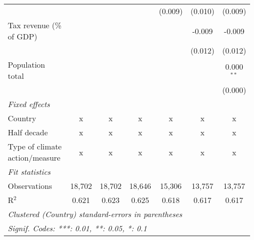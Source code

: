 \begin{tabular}{lcccccc}
                                                        &         &              &               & (0.009)        & (0.010)        & (0.009)\\   
   Tax revenue (\% of GDP)                              &         &              &               &                & -0.009         & -0.009\\   
                                                        &         &              &               &                & (0.012)        & (0.012)\\   
   Population total                                     &         &              &               &                &                & 0.000$^{**}$\\   
                                                        &         &              &               &                &                & (0.000)\\   
   \emph{Fixed effects}\\
   Country                                              & x       & x            & x             & x              & x              & x\\  
   Half decade                                          & x       & x            & x             & x              & x              & x\\  
   Type of climate action/measure                       & x       & x            & x             & x              & x              & x\\  
   \midrule \emph{Fit statistics}\\
   Observations                                         & 18,702  & 18,702       & 18,646        & 15,306         & 13,757         & 13,757\\  
   R$^2$                                                & 0.621   & 0.623        & 0.625         & 0.618          & 0.617          & 0.617\\  
   \midrule
   \multicolumn{7}{l}{\emph{Clustered (Country) standard-errors in parentheses}}\\
   \multicolumn{7}{l}{\emph{Signif. Codes: ***: 0.01, **: 0.05, *: 0.1}}\\
\end{tabular}
\par\endgroup


